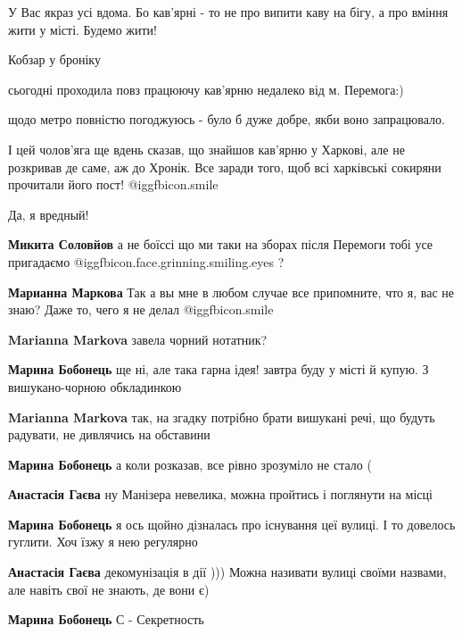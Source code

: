 \begin{itemize}
У Вас якраз усі вдома. Бо кав'ярні - то не про випити каву на бігу, а про вміння жити у місті. Будемо жити!

Кобзар у броніку


сьогодні проходила повз працюючу кав'ярню недалеко від м. Перемога:)

щодо метро повністю погоджуюсь - було б дуже добре, якби воно запрацювало.


І цей чолов'яга ще вдень сказав, що знайшов кав'ярню у Харкові, але не
розкривав де саме, аж до Хронік. Все заради того, щоб всі харківські сокиряни
прочитали його пост!  @igg{fbicon.smile} 

\begin{itemize} %
Да, я вредный!

\textbf{Микита Соловйов} а не боїссі що ми таки на зборах після Перемоги тобі усе пригадаємо @igg{fbicon.face.grinning.smiling.eyes} ?

\textbf{Марианна Маркова} Так а вы мне в любом случае все припомните, что я, вас не знаю? Даже то, чего я не делал  @igg{fbicon.smile} 

\textbf{Marianna Markova} завела чорний нотатник?

\textbf{Марина Бобонець} ще ні, але така гарна ідея! завтра буду у місті й купую. З вишукано-чорною обкладинкою

\textbf{Marianna Markova} так, на згадку потрібно брати вишукані речі, що будуть радувати, не дивлячись на обставини

\textbf{Марина Бобонець} а коли розказав, все рівно зрозуміло не стало (

\textbf{Анастасія Гаєва} ну Манізера невелика, можна пройтись і поглянути на місці

\textbf{Марина Бобонець} я ось щойно дізналась про існування цеї вулиці. І то довелось гуглити. Хоч їзжу я нею регулярно

\textbf{Анастасія Гаєва} декомунізація в дії ))) Можна називати вулиці своїми назвами, але навіть свої не знають, де вони є)

\textbf{Марина Бобонець} С - Секретность
\end{itemize} %


\end{itemize}
